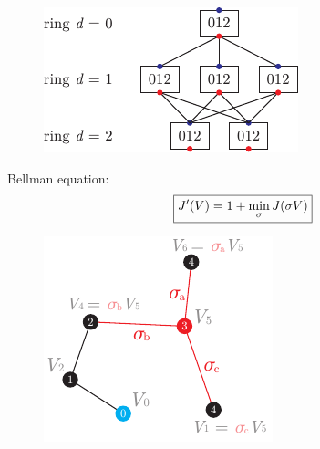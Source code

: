 \begin{minipage}{0.60\textwidth}
\begin{figure}[h]
    \centering
    \includegraphics{imgs/pAsset 3.pdf}
\end{figure}
\end{minipage}
\hfill
\begin{minipage}{0.37\textwidth}
Bellman equation: \vspace{-2mm}
\begin{equation*}
	\phantom{42} \hfill \boxed{J'(V) = 1 + \min_\sigma J(\sigma V)}
\end{equation*}

    \begin{figure}[h]
	    \centering
	    \includegraphics{imgs/pAsset 4.pdf}
	\end{figure}
\end{minipage}

